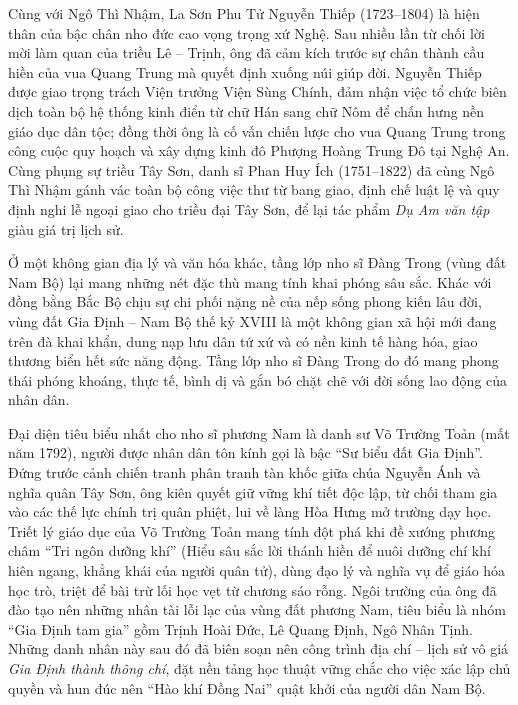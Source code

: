 Cùng với Ngô Thì Nhậm, La Sơn Phu Tử Nguyễn Thiếp (1723--1804) là hiện thân của bậc chân nho đức cao vọng trọng xứ Nghệ. Sau nhiều lần từ chối lời mời làm quan của triều Lê -- Trịnh, ông đã cảm kích trước sự chân thành cầu hiền của vua Quang Trung mà quyết định xuống núi giúp đời. Nguyễn Thiếp được giao trọng trách Viện trưởng Viện Sùng Chính, đảm nhận việc tổ chức biên dịch toàn bộ hệ thống kinh điển từ chữ Hán sang chữ Nôm để chấn hưng nền giáo dục dân tộc; đồng thời ông là cố vấn chiến lược cho vua Quang Trung trong công cuộc quy hoạch và xây dựng kinh đô Phượng Hoàng Trung Đô tại Nghệ An. Cùng phụng sự triều Tây Sơn, danh sĩ Phan Huy Ích (1751--1822) đã cùng Ngô Thì Nhậm gánh vác toàn bộ công việc thư từ bang giao, định chế luật lệ và quy định nghi lễ ngoại giao cho triều đại Tây Sơn, để lại tác phẩm \textit{Dụ Am văn tập} giàu giá trị lịch sử.

Ở một không gian địa lý và văn hóa khác, tầng lớp nho sĩ Đàng Trong (vùng đất Nam Bộ) lại mang những nét đặc thù mang tính khai phóng sâu sắc. Khác với đồng bằng Bắc Bộ chịu sự chi phối nặng nề của nếp sống phong kiến lâu đời, vùng đất Gia Định -- Nam Bộ thế kỷ XVIII là một không gian xã hội mới đang trên đà khai khẩn, dung nạp lưu dân tứ xứ và có nền kinh tế hàng hóa, giao thương biển hết sức năng động. Tầng lớp nho sĩ Đàng Trong do đó mang phong thái phóng khoáng, thực tế, bình dị và gắn bó chặt chẽ với đời sống lao động của nhân dân.

Đại diện tiêu biểu nhất cho nho sĩ phương Nam là danh sư Võ Trường Toản (mất năm 1792), người được nhân dân tôn kính gọi là bậc ``Sư biểu đất Gia Định''. Đứng trước cảnh chiến tranh phân tranh tàn khốc giữa chúa Nguyễn Ánh và nghĩa quân Tây Sơn, ông kiên quyết giữ vững khí tiết độc lập, từ chối tham gia vào các thế lực chính trị quân phiệt, lui về làng Hòa Hưng mở trường dạy học. Triết lý giáo dục của Võ Trường Toản mang tính đột phá khi đề xướng phương châm ``Tri ngôn dưỡng khí'' (Hiểu sâu sắc lời thánh hiền để nuôi dưỡng chí khí hiên ngang, khẳng khái của người quân tử), dùng đạo lý và nghĩa vụ để giáo hóa học trò, triệt để bài trừ lối học vẹt từ chương sáo rỗng. Ngôi trường của ông đã đào tạo nên những nhân tài lỗi lạc của vùng đất phương Nam, tiêu biểu là nhóm ``Gia Định tam gia'' gồm Trịnh Hoài Đức, Lê Quang Định, Ngô Nhân Tịnh. Những danh nhân này sau đó đã biên soạn nên công trình địa chí -- lịch sử vô giá \textit{Gia Định thành thông chí}, đặt nền tảng học thuật vững chắc cho việc xác lập chủ quyền và hun đúc nên ``Hào khí Đồng Nai'' quật khởi của người dân Nam Bộ.

